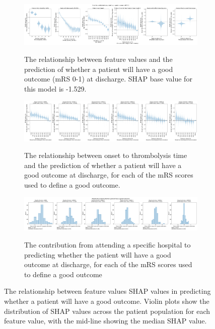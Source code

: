 \begin{figure}
    \centering
    \begin{subfigure}[b]{0.8\textwidth}
      \centering
      \includegraphics[trim={0 0 0 1.2cm}, clip, width=1\textwidth]{./images/p3_clin_shap_sub_1}\\
      \caption{The relationship between feature values and the prediction of whether a patient will have a good outcome (mRS 0-1) at discharge. SHAP base value for this model is -1.529.}
      \label{fig:global_shap_mrs1}
    \end{subfigure}
    \hfill
    \begin{subfigure}[b]{0.8\textwidth}
      \centering    
      \includegraphics[width=1\textwidth]{./images/p3_clin_shap_sub_2.jpg}\\
      \caption{The relationship between onset to thrombolysis time and the prediction of whether a patient will have a good outcome at discharge, for each of the mRS scores used to define a good outcome.}
      \label{fig:global_shap_ott}
    \end{subfigure}
    \hfill
    \begin{subfigure}[b]{0.8\textwidth}
      \centering
      \includegraphics[trim={0 0 0 1.2cm}, clip, width=1\textwidth]{./images/p3_clin_shap_sub_3}\\
      \caption{The contribution from attending a specific hospital to predicting whether the patient will have a good outcome at discharge, for each of the mRS scores used to define a good outcome}
      \label{fig:global_shap_hosp}
    \end{subfigure}
    \label{fig:global_shap}
  \caption{The relationship between feature values SHAP values in predicting whether a patient will have a good outcome. Violin plots show the distribution of SHAP values across the patient population for each feature value, with the mid-line showing the median SHAP value.} 
\end{figure}

